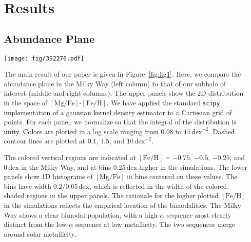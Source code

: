\documentclass[twocolumn]{aastex631}
\newcommand{\Gyr}{\ensuremath{\textrm{Gyr}}}
\newcommand{\FeH}{\ensuremath{[\textrm{Fe}/\textrm{H}]}}
\newcommand{\MgFe}{\ensuremath{[\textrm{Mg}/\textrm{Fe}]}}
\newcommand{\dex}{\ensuremath{\textrm{dex}}}
\begin{document}
\section{Results}\label{sec:results}
\subsection{Abundance Plane}\label{ssec:plane}

\begin{figure*}
  \centering
  \texttt{[image: fig/392276.pdf]}
  \caption{\textbf{When old stars are $\alpha$-enhanced, our subhalo of interest from TNG displays a prominent bimodality.} The upper left panel shows the distribution in the \MgFe{}-\FeH{} plane of the Milky Way, demonstrating a clear bimodality (data selection given in text). The lower left panel shows the 1D histograms of \MgFe{} at fixed \FeH{} values of $-0.5$, $-0.25$, $0$, and $0.25$ (blue, orange, green, and red, respectively). In the Milky Way, the bimodality is strongest at low metallicities while disappearing at high metallicities. The middle column shows the same plots but for our TNG subhalo of interest (392276) and with the fixed \FeH{} values $0.25\,\dex$ lower. Only faint structure is seen in the lowest bin (blue, $-0.75\,\dex$). The right column shows the same subhalo but after increasing the \MgFe{} value of star particles formed before $z=1.5$ linearly with formation time (with a slope of $0.1\dex/\Gyr$). A clear bimodality is shown in these panels which, unlike in the Milky Way, is present at all metallicities.}
  \label{fig:fig1}
\end{figure*}

The main result of our paper is given in Figure~\ref{fig:fig1}. Here, we compare the abundance plane in the Milky Way (left column) to that of our subhalo of interest (middle and right columns). The upper panels show the 2D distribution in the space of \MgFe{}-\FeH{}. We have applied the standard \texttt{scipy} implementation of a gaussian kernel density estimator to a Cartesian grid of points. For each panel, we normalize so that the integral of the distribution is unity. Colors are plotted in a log scale ranging from $0.08$ to $15\,\dex^{-2}$. Dashed contour lines are plotted at $0.1$, $1.5$, and $10\,\dex^{-2}$.

The colored vertical regions are indicated at $\FeH=-0.75$, $-0.5$, $-0.25$, and $0\,\dex$ in the Milky Way, and at bins $0.25\,\dex$ higher in the simulations. The lower panels show 1D histograms of \MgFe{} in bins centered on these values. The bins have width $0.2$/$0.05\,\dex$, which is reflected in the width of the colored, shaded regions in the upper panels. The rationale for the higher plotted \FeH{} in the simulations reflects the empirical location of the bimodalities. The Milky Way shows a clear bimodal population, with a high-$\alpha$ sequence most clearly distinct from the low-$\alpha$ sequence at low metallicity. The two sequences merge around solar metallicity.
\end{document}
